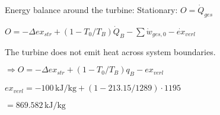 Energy balance around the turbine:  
Stationary: \( O = \dot{Q}_{ges} \)  

\( O = -\Delta ex_{str} + (1 - T_0 / T_B) \dot{Q}_B - \sum \dot{w}_{ges,0} - \dot{ex}_{verl} \)  

The turbine does not emit heat across system boundaries.  

\( \Rightarrow O = -\Delta ex_{str} + (1 - T_0 / T_B) q_B - ex_{verl} \)  

\( ex_{verl} = -100 \, \text{kJ/kg} + (1 - 213.15 / 1289) \cdot 1195 \)  

\( = 869.582 \, \text{kJ/kg} \)
